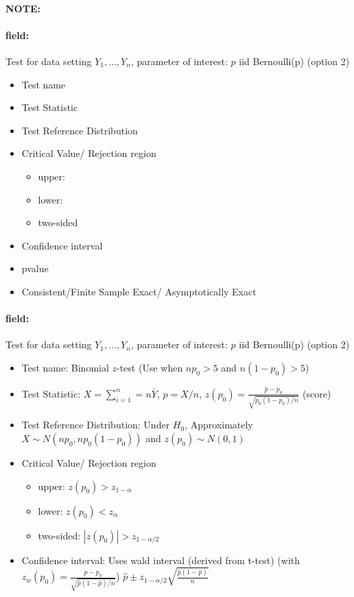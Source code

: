 \documentclass[12pt]{article}
\newenvironment{note}{\paragraph{NOTE:}}{}
\newenvironment{field}{\paragraph{field:}}{}
\begin{document}
\begin{note}
  \begin{field}
    Test for data setting $Y_1, \ldots, Y_n$, parameter of interest: $p$ iid Bernoulli(p) (option 2)
    \begin{itemize}
      \item Test name
      \item Test Statistic
      \item Test Reference Distribution
      \item Critical Value/ Rejection region
            \begin{itemize}
              \item upper:
              \item lower:
              \item two-sided
            \end{itemize}
      \item Confidence interval
      \item pvalue
      \item Consistent/Finite Sample Exact/ Asymptotically Exact
    \end{itemize}
  \end{field}
  \begin{field}
    Test for data setting $Y_1, \ldots, Y_n$, parameter of interest: $p$ iid Bernoulli(p) (option 2)
    \begin{itemize}
			\item Test name: Binomial $z$-test (Use when $np_0 > 5$ and $n(1-p_0) > 5$)
			\item Test Statistic: $X  = \sum_{i=1}^n = n\bar{Y}$, $\hat{p} = X/n$, $z(p_0) = \frac{\hat{p}- p_0}{\sqrt{p_0(1-p_0)/n}}$ (score)
			\item Test Reference Distribution: Under $H_0$, Approximately $X \sim N(np_0,np_0(1-p_0))$ and $z(p_0) \sim N(0,1)$
			\item Critical Value/ Rejection region
			      \begin{itemize}
				      \item upper: $z(p_0) > z_{1-\alpha}$
				      \item lower: $z(p_0) < z_\alpha$
				      \item two-sided: $|z(p_0)| > z_{1-\alpha/2}$
			      \end{itemize}
			\item Confidence interval: Uses wald interval (derived from t-test) (with $z_w(p_0) = \frac{\hat{p} - p_0}{\sqrt{\hat{p}(1 - \hat{p})/n}}$) $\hat{p} \pm z_{1-\alpha/2}\sqrt{\frac{\hat{p}(1 - \hat{p})}{n}}$

\end{itemize}
\end{field}
\end{note}
\end{document}
